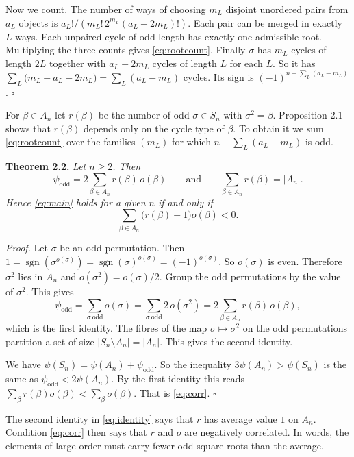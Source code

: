 \documentclass[10pt]{article}
\begin{document}
Now we count. The number of ways of choosing $m_L$ disjoint unordered pairs from $a_L$
objects is $a_L!/(m_L!\,2^{m_L}(a_L-2m_L)!)$. Each pair can be merged in exactly $L$ ways.
Each unpaired cycle of odd length has exactly one admissible root. Multiplying the three
counts gives \eqref{eq:rootcount}. Finally $\sigma$ has $m_L$ cycles of length $2L$ together
with $a_L-2m_L$ cycles of length $L$ for each $L$. So it has
$\sum_L\bigl(m_L+a_L-2m_L\bigr)=\sum_L(a_L-m_L)$ cycles. Its sign is
$(-1)^{n-\sum_L(a_L-m_L)}$. $\square$

\medskip
For $\beta\in A_n$ let $r(\beta)$ be the number of odd $\sigma\in S_n$ with
$\sigma^{2}=\beta$. Proposition 2.1 shows that $r(\beta)$ depends only on the cycle type of
$\beta$. To obtain it we sum \eqref{eq:rootcount} over the families $(m_L)$ for which
$n-\sum_L(a_L-m_L)$ is odd.

\medskip\noindent
\textbf{Theorem 2.2.} \emph{Let $n\ge2$. Then}
\begin{equation}\label{eq:identity}
  \psi_{\mathrm{odd}}=2\sum_{\beta\in A_n}r(\beta)\,o(\beta)
  \qquad\text{and}\qquad
  \sum_{\beta\in A_n}r(\beta)=|A_n|.
\end{equation}
\emph{Hence \eqref{eq:main} holds for a given $n$ if and only if}
\begin{equation}\label{eq:corr}
  \sum_{\beta\in A_n}\bigl(r(\beta)-1\bigr)o(\beta)<0.
\end{equation}

\medskip\noindent
\textit{Proof.} Let $\sigma$ be an odd permutation. Then
$1=\operatorname{sgn}(\sigma^{o(\sigma)})=\operatorname{sgn}(\sigma)^{o(\sigma)}
=(-1)^{o(\sigma)}$. So $o(\sigma)$ is even. Therefore $\sigma^{2}$ lies in $A_n$ and
$o(\sigma^{2})=o(\sigma)/2$. Group the odd permutations by the value of $\sigma^{2}$. This
gives
\[
  \psi_{\mathrm{odd}}=\sum_{\sigma\ \text{odd}}o(\sigma)
  =\sum_{\sigma\ \text{odd}}2\,o(\sigma^{2})
  =2\sum_{\beta\in A_n}r(\beta)\,o(\beta),
\]
which is the first identity. The fibres of the map $\sigma\mapsto\sigma^{2}$ on the odd
permutations partition a set of size $|S_n\setminus A_n|=|A_n|$. This gives the second
identity.

We have $\psi(S_n)=\psi(A_n)+\psi_{\mathrm{odd}}$. So the inequality $3\psi(A_n)>\psi(S_n)$
is the same as $\psi_{\mathrm{odd}}<2\psi(A_n)$. By the first identity this reads
$\sum_{\beta}r(\beta)o(\beta)<\sum_{\beta}o(\beta)$. That is \eqref{eq:corr}. $\square$

\medskip
The second identity in \eqref{eq:identity} says that $r$ has average value $1$ on $A_n$.
Condition \eqref{eq:corr} then says that $r$ and $o$ are negatively correlated. In words,
the elements of large order must carry fewer odd square roots than the average.
\end{document}
